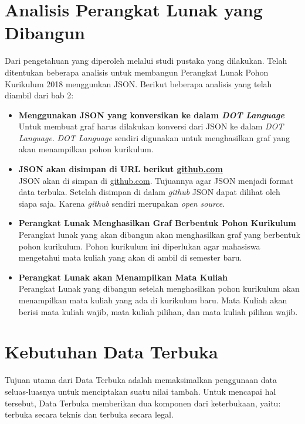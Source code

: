 \section{Analisis Perangkat Lunak yang Dibangun}
\label{sec: Analisis Perangkat Lunak yang Dibangun}
Dari pengetahuan yang diperoleh melalui studi pustaka yang dilakukan. Telah ditentukan beberapa analisis untuk membangun Perangkat Lunak Pohon Kurikulum 2018 menggunkan JSON. Berikut beberapa analisis yang telah diambil dari bab 2: 
\begin{itemize}
\item \textbf{Menggunakan JSON yang konversikan ke dalam \textit{DOT Language}}\\
Untuk membuat graf harus dilakukan konversi dari JSON ke dalam \textit{DOT Language}. \textit{DOT Language} sendiri digunakan untuk menghasilkan graf yang akan menampilkan pohon kurikulum. 

\item \textbf{JSON akan disimpan di URL berikut \url{github.com}}\\
JSON akan di simpan di \url{github.com}. Tujuannya agar JSON menjadi format data terbuka. Setelah disimpan di dalam \textit{github} JSON dapat dilihat oleh siapa saja. Karena \textit{github} sendiri merupakan \textit{open source}.

\item \textbf{Perangkat Lunak Menghasilkan Graf Berbentuk Pohon Kurikulum}\\
Perangkat lunak yang akan dibangun akan menghasilkan graf yang berbentuk pohon kurikulum. Pohon kurikulum ini diperlukan agar mahasiswa mengetahui mata kuliah yang akan di ambil di semester baru. 

\item \textbf{Perangkat Lunak akan Menampilkan Mata Kuliah}\\
Perangkat Lunak yang dibangun setelah menghasilkan pohon kurikulum akan menampilkan mata kuliah yang ada di kurikulum baru. Mata Kuliah akan berisi mata kuliah wajib, mata kuliah pilihan, dan mata kuliah pilihan wajib.
\end{itemize}

\section{Kebutuhan Data Terbuka}
\label{sec: Kebutuhan Data Terbuka}

Tujuan utama dari Data Terbuka adalah memaksimalkan penggunaan data seluas-luasnya untuk menciptakan suatu nilai tambah. Untuk mencapai hal tersebut, Data Terbuka memberikan dua komponen dari keterbukaan, yaitu: terbuka secara teknis dan terbuka secara legal. 

